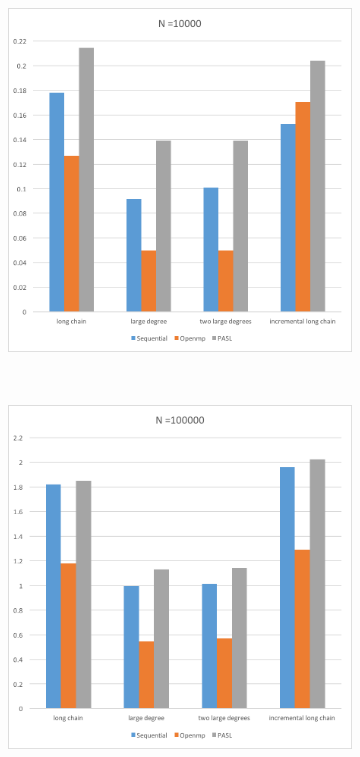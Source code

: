 \documentclass[specification,annotation]{itmo-student-thesis}
\begin{document}
\begin{figure}[!ht]
\centering
\begin{subfigure}[b]{0.45\textwidth}
    \includegraphics[width=\textwidth]{pic/results-2-a.png}
\end{subfigure}~~\begin{subfigure}[b]{0.45\textwidth}
    \includegraphics[width=\textwidth]{pic/results-2-b.png}

\end{subfigure}
\end{figure}
\end{document}

